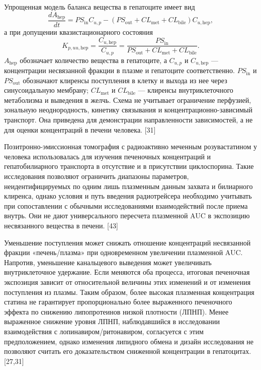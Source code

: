 \documentclass[11pt]{article}
\begin{document}
Упрощенная модель баланса вещества в гепатоците имеет вид
\[
\frac{dA_{\mathrm{hep}}}{dt}
=PS_{\mathrm{in}}C_{u,p}
-\left(PS_{\mathrm{out}}+CL_{\mathrm{met}}+CL_{\mathrm{bile}}\right)C_{u,\mathrm{hep}},
\]
а при допущении квазистационарного состояния
\[
K_{p,uu,\mathrm{hep}}=
\frac{C_{u,\mathrm{hep}}}{C_{u,p}}
=\frac{PS_{\mathrm{in}}}
{PS_{\mathrm{out}}+CL_{\mathrm{met}}+CL_{\mathrm{bile}}}.
\]
\(A_{\mathrm{hep}}\) обозначает количество вещества в гепатоците, а \(C_{u,p}\) и \(C_{u,\mathrm{hep}}\) --- концентрации несвязанной фракции в плазме и гепатоците соответственно. \(PS_{\mathrm{in}}\) и \(PS_{\mathrm{out}}\) обозначают клиренсы поступления в клетку и выхода из нее через синусоидальную мембрану; \(CL_{\mathrm{met}}\) и \(CL_{\mathrm{bile}}\) --- клиренсы внутриклеточного метаболизма и выведения в желчь. Схема не учитывает ограничение перфузией, зональную неоднородность, кинетику связывания и концентрационно-зависимый транспорт. Она приведена для демонстрации направленности зависимостей, а не для оценки концентраций в печени человека. [31]

Позитронно-эмиссионная томография с радиоактивно меченным розувастатином у человека использовалась для изучения печеночных концентраций и гепатобилиарного транспорта в отсутствие и в присутствии циклоспорина. Такие исследования позволяют ограничить диапазоны параметров, неидентифицируемых по одним лишь плазменным данным захвата и билиарного клиренса, однако условия и путь введения радиотрейсера необходимо учитывать при сопоставлении с обычными исследованиями взаимодействий после приема внутрь. Они не дают универсального пересчета плазменной AUC в экспозицию несвязанного вещества в печени. [43]

Уменьшение поступления может снижать отношение концентраций несвязанной фракции «печень/плазма» при одновременном увеличении плазменной AUC. Напротив, уменьшение канальцевого выведения может увеличивать внутриклеточное удержание. Если меняются оба процесса, итоговая печеночная экспозиция зависит от относительной величины этих изменений и от изменения поступления из плазмы. Таким образом, более высокая плазменная концентрация статина не гарантирует пропорционально более выраженного печеночного эффекта по снижению липопротеинов низкой плотности (ЛПНП). Менее выраженное снижение уровня ЛПНП, наблюдавшийся в исследовании взаимодействия с лопинавиром/ритонавиром, согласуется с этим предположением, однако изменения липидного обмена и дизайн исследования не позволяют считать его доказательством сниженной концентрации в гепатоцитах. [27,31]
\end{document}
